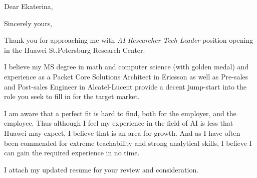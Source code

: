 \documentclass[10pt,a4paper,sans]{moderncv}
\begin{document}



	

	
\clearpage

\date{\today}
\opening{Dear Ekaterina,}
\closing{Sincerely yours,}
\makelettertitle


	 Thank you for approaching me with \textsl{AI Researcher Tech Leader} position opening in the Huawei St.Petersburg Research Center.
	 
	 I believe my MS degree in math and computer science (with golden medal) and experience as a Packet Core Solutions Architect in Ericsson as well as Pre-sales and Post-sales Engineer in Alcatel-Lucent provide a decent jump-start into the role you seek to fill in for the target market.
	 
	 I am aware that a perfect fit is hard to find, both for the employer, and the employee. Thus although I feel my experience in the field of AI is less that Huawei may expect, I believe that is an area for growth.	And as I have often been commended for extreme teachability and strong analytical skills, I believe I can gain the required experience in no time.
	 
	I attach my updated resume for your review and consideration.
	
\makeletterclosing
		
\end{document}
